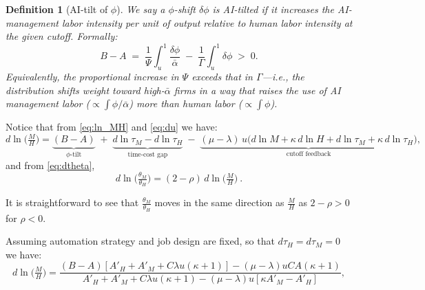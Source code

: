 \documentclass[english]{article}
\newtheorem{definition}{Definition}
\begin{document}
\vspace{2cm}

\begin{definition}[AI-tilt of $\phi$]
We say a $\phi$-shift $\delta\phi$ is \emph{AI-tilted} if it increases the \emph{AI-management labor intensity per unit of output} relative to human labor intensity at the given cutoff. Formally:
\[
B-A 
\;=\;   
\frac{1}{\Psi}\int_u^1\frac{\delta\phi}{\bar\alpha} \;-\; \frac{1}{\Gamma}\int_u^1\delta\phi 
\;>\; 
0.
\]
Equivalently, the proportional increase in $\Psi$ exceeds that in $\Gamma$---i.e., the distribution shifts weight toward high-$\bar\alpha$ firms in a way that raises the use of AI management labor ($\propto \int\phi/\bar\alpha$) more than human labor ($\propto \int\phi$).
\end{definition}



Notice that from \eqref{eq:ln_MH} and \eqref{eq:du} we have:
\[
\boxed{
d\ln\!\Big(\tfrac{M}{H}\Big)
=\underbrace{(B-A)}_{\text{$\phi$-tilt}}
\;+\;\underbrace{d\ln\tau_M-d\ln\tau_H}_{\text{time-cost gap}}
\;-\;\underbrace{(\mu-\lambda)\,u\Big(d\ln M+\kappa\,d\ln H+d\ln\tau_M+\kappa\,d\ln\tau_H\Big)}_{\text{cutoff feedback}},
}
\]
and from \eqref{eq:dtheta},
\[
\boxed{\ d\ln\!\Big(\tfrac{\theta_M}{\theta_H}\Big)=(2-\rho)\,d\ln\!\Big(\tfrac{M}{H}\Big)\ .\ }
\]

It is straightforward to see that $\frac{\theta_M}{\theta_H}$ moves in the same direction as $\frac{M}{H}$ as $2-\rho>0$ for $\rho<0$.


\vspace{2cm}

Assuming automation strategy and job design are fixed, so that $d\tau_H=d\tau_M=0$ we have:
\[
d\ln\!\Big(\tfrac{M}{H}\Big)
=
\frac{(B-A)[A'_H + A'_M+C\lambda u(\kappa+1)] - (\mu-\lambda)uCA(\kappa+1)}
{A'_H+A'_M+C\lambda u(\kappa+1) - (\mu - \lambda)u[\kappa A'_M-A'_H]}
,
\]
\end{document}
